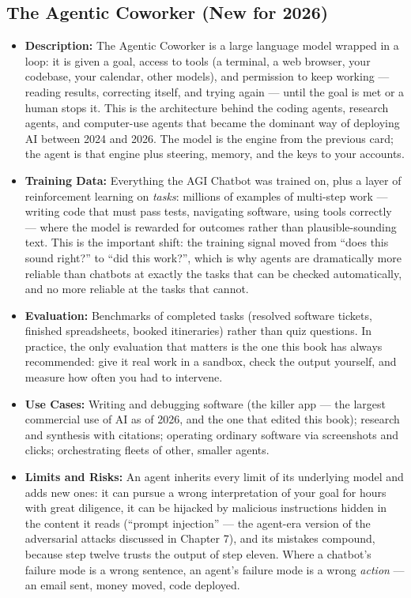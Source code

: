 \subsection{The Agentic Coworker (New for 2026)}

\begin{itemize}
    \item \textbf{Description:} The Agentic Coworker is a large language model wrapped in a loop: it is given a goal, access to tools (a terminal, a web browser, your codebase, your calendar, other models), and permission to keep working --- reading results, correcting itself, and trying again --- until the goal is met or a human stops it. This is the architecture behind the coding agents, research agents, and computer-use agents that became the dominant way of deploying AI between 2024 and 2026. The model is the engine from the previous card; the agent is that engine plus steering, memory, and the keys to your accounts.
    \item \textbf{Training Data:} Everything the AGI Chatbot was trained on, plus a layer of reinforcement learning on \textit{tasks}: millions of examples of multi-step work --- writing code that must pass tests, navigating software, using tools correctly --- where the model is rewarded for outcomes rather than plausible-sounding text. This is the important shift: the training signal moved from ``does this sound right?'' to ``did this work?'', which is why agents are dramatically more reliable than chatbots at exactly the tasks that can be checked automatically, and no more reliable at the tasks that cannot.
    \item \textbf{Evaluation:} Benchmarks of completed tasks (resolved software tickets, finished spreadsheets, booked itineraries) rather than quiz questions. In practice, the only evaluation that matters is the one this book has always recommended: give it real work in a sandbox, check the output yourself, and measure how often you had to intervene.
    \item \textbf{Use Cases:} Writing and debugging software (the killer app --- the largest commercial use of AI as of 2026, and the one that edited this book); research and synthesis with citations; operating ordinary software via screenshots and clicks; orchestrating fleets of other, smaller agents.
    \item \textbf{Limits and Risks:} An agent inherits every limit of its underlying model and adds new ones: it can pursue a wrong interpretation of your goal for hours with great diligence, it can be hijacked by malicious instructions hidden in the content it reads (``prompt injection'' --- the agent-era version of the adversarial attacks discussed in Chapter 7), and its mistakes compound, because step twelve trusts the output of step eleven. Where a chatbot's failure mode is a wrong sentence, an agent's failure mode is a wrong \textit{action} --- an email sent, money moved, code deployed.

\end{itemize}

